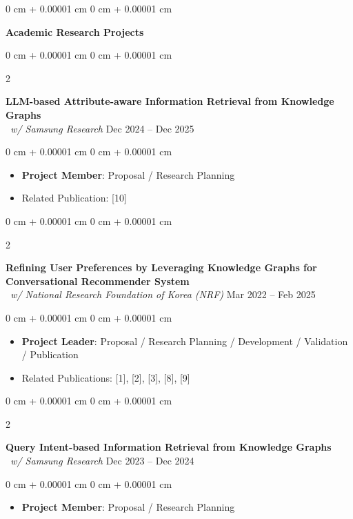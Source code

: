 \documentclass[10pt, letterpaper]{article}
\newenvironment{highlights}{
	\begin{itemize}[
		topsep=0.10 cm,
		parsep=0.10 cm,
		partopsep=0pt,
		itemsep=0pt,
		leftmargin=0 cm + 10pt
		]
	}{
	\end{itemize}
} %
\newenvironment{onecolentry}{
	\begin{adjustwidth}{
			0 cm + 0.00001 cm
		}{
			0 cm + 0.00001 cm
		}
	}{
	\end{adjustwidth}
} %
\newenvironment{twocolentry}[2][]{
	\onecolentry
	\def\secondColumn{#2}
	\setcolumnwidth{\fill, 4.5 cm}
	\begin{paracol}{2}
	}{
		\switchcolumn \raggedleft \secondColumn
	\end{paracol}
	\endonecolentry
} %
\begin{document}
	\vspace{0.40 cm} %
	
	\begin{onecolentry}
		\textbf{\large \faGraduationCap \hspace{0.1cm} Academic Research Projects}
	\end{onecolentry}
	\vspace{0.15 cm}
	
	
		\begin{twocolentry}{
			Dec 2024 – Dec 2025
		}
		\textbf{LLM-based Attribute-aware Information Retrieval from Knowledge Graphs}\\ 
		\textit{\ w/ Samsung Research}\end{twocolentry}
	\begin{onecolentry}
		\begin{highlights}
			\item \textbf{Project Member}: Proposal / Research Planning
			\item Related Publication: [10]
		\end{highlights}
	\end{onecolentry}
	\vspace{0.20 cm}
	
	
	\begin{twocolentry}{
			Mar 2022 – Feb 2025
		}
		\textbf{Refining User Preferences by Leveraging Knowledge Graphs for Conversational Recommender System}\\ 
		\textit{\ w/ National Research Foundation of Korea (NRF)}\end{twocolentry}
	\begin{onecolentry}
		\begin{highlights}
			\item \textbf{Project Leader}: Proposal / Research Planning / Development / Validation / Publication 
			\item Related Publications: [1], [2], [3], [8], [9]
		\end{highlights}
	\end{onecolentry}
	\vspace{0.20 cm}
	
	
	\begin{twocolentry}{
			Dec 2023 – Dec 2024
		}
		\textbf{Query Intent-based Information Retrieval from Knowledge Graphs}\\ 
		\textit{\ w/ Samsung Research}\end{twocolentry}
	\begin{onecolentry}
		\begin{highlights}
			\item \textbf{Project Member}: Proposal / Research Planning
		\end{highlights}
	\end{onecolentry}
	\vspace{0.20 cm}
	
\end{document}

